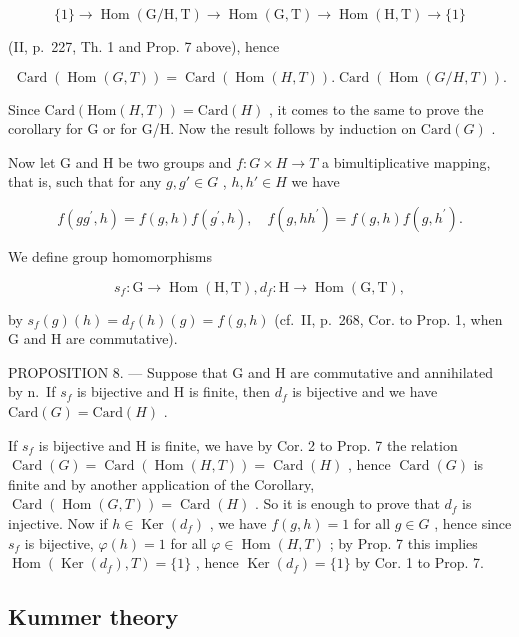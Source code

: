 \[
\{1 \} \rightarrow \operatorname{Hom} (\mathrm{G} / \mathrm{H}, \mathrm{T}) \rightarrow \operatorname{Hom} (\mathrm{G}, \mathrm{T}) \rightarrow \operatorname{Hom} (\mathrm{H}, \mathrm{T}) \rightarrow \{1 \}
\]

(II, p.~227, Th. 1 and Prop. 7 above), hence

\[
\operatorname{Card} (\operatorname{Hom} (G, T)) = \operatorname{Card} (\operatorname{Hom} (H, T)). \operatorname{Card} (\operatorname{Hom} (G / H, T)).
\]

Since \(\text{Card}(\text{Hom}(H, T)) = \text{Card}(H)\) , it comes to the same to prove the corollary for G or for G/H. Now the result follows by induction on \(\text{Card}(G)\) .

Now let G and H be two groups and \(f: G \times H \to T\) a bimultiplicative mapping, that is, such that for any \(g, g' \in G\) , \(h, h' \in H\) we have

\[
f (g g ^ {\prime}, h) = f (g, h) f (g ^ {\prime}, h), \quad f (g, h h ^ {\prime}) = f (g, h) f (g, h ^ {\prime}).
\]

We define group homomorphisms

\[
s _ {f} \colon \mathrm{G} \to \operatorname{Hom} (\mathrm{H}, \mathrm{T}), d _ {f} \colon \mathrm{H} \to \operatorname{Hom} (\mathrm{G}, \mathrm{T}),
\]

by \(s_f(g)(h) = d_f(h)(g) = f(g, h)\) (cf.~II, p.~268, Cor. to Prop. 1, when G and H are commutative).

PROPOSITION 8. --- Suppose that G and H are commutative and annihilated by n.~If \(s_{f}\) is bijective and H is finite, then \(d_{f}\) is bijective and we have \(\text{Card}(G) = \text{Card}(H)\) .

If \(s_{f}\) is bijective and H is finite, we have by Cor. 2 to Prop. 7 the relation \(\operatorname{Card}(G) = \operatorname{Card}(\operatorname{Hom}(H, T)) = \operatorname{Card}(H)\) , hence \(\operatorname{Card}(G)\) is finite and by another application of the Corollary, \(\operatorname{Card}(\operatorname{Hom}(G, T)) = \operatorname{Card}(H)\) . So it is enough to prove that \(d_{f}\) is injective. Now if \(h \in \operatorname{Ker}(d_{f})\) , we have \(f(g, h) = 1\) for all \(g \in G\) , hence since \(s_{f}\) is bijective, \(\varphi(h) = 1\) for all \(\varphi \in \operatorname{Hom}(H, T)\) ; by Prop. 7 this implies \(\operatorname{Hom}(\operatorname{Ker}(d_{f}), T) = \{1\}\) , hence \(\operatorname{Ker}(d_{f}) = \{1\}\) by Cor. 1 to Prop. 7.

\subsection{Kummer theory}

